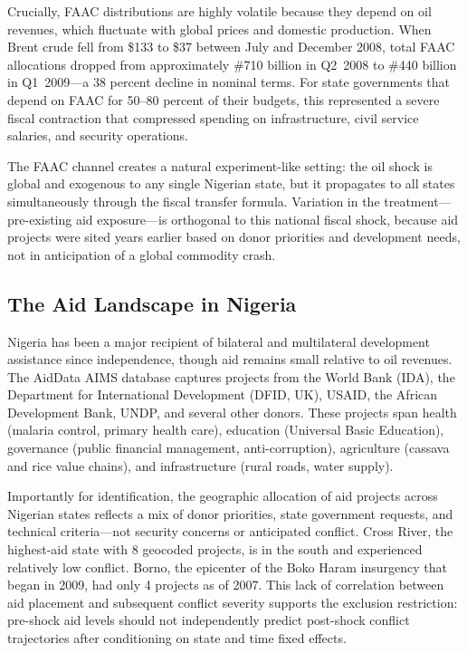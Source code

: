 \documentclass[12pt]{article}
\newcommand{\textnaira}{\textnormal{\#}}
\begin{document}
Crucially, FAAC distributions are highly volatile because they depend on oil revenues, which fluctuate with global prices and domestic production. When Brent crude fell from \$133 to \$37 between July and December 2008, total FAAC allocations dropped from approximately \textnaira{}710 billion in Q2~2008 to \textnaira{}440 billion in Q1~2009---a 38 percent decline in nominal terms. For state governments that depend on FAAC for 50--80 percent of their budgets, this represented a severe fiscal contraction that compressed spending on infrastructure, civil service salaries, and security operations.

The FAAC channel creates a natural experiment-like setting: the oil shock is global and exogenous to any single Nigerian state, but it propagates to all states simultaneously through the fiscal transfer formula. Variation in the treatment---pre-existing aid exposure---is orthogonal to this national fiscal shock, because aid projects were sited years earlier based on donor priorities and development needs, not in anticipation of a global commodity crash.

\subsection{The Aid Landscape in Nigeria}

Nigeria has been a major recipient of bilateral and multilateral development assistance since independence, though aid remains small relative to oil revenues. The AidData AIMS database captures projects from the World Bank (IDA), the Department for International Development (DFID, UK), USAID, the African Development Bank, UNDP, and several other donors. These projects span health (malaria control, primary health care), education (Universal Basic Education), governance (public financial management, anti-corruption), agriculture (cassava and rice value chains), and infrastructure (rural roads, water supply).

Importantly for identification, the geographic allocation of aid projects across Nigerian states reflects a mix of donor priorities, state government requests, and technical criteria---not security concerns or anticipated conflict. Cross River, the highest-aid state with 8 geocoded projects, is in the south and experienced relatively low conflict. Borno, the epicenter of the Boko Haram insurgency that began in 2009, had only 4 projects as of 2007. This lack of correlation between aid placement and subsequent conflict severity supports the exclusion restriction: pre-shock aid levels should not independently predict post-shock conflict trajectories after conditioning on state and time fixed effects.
\end{document}
